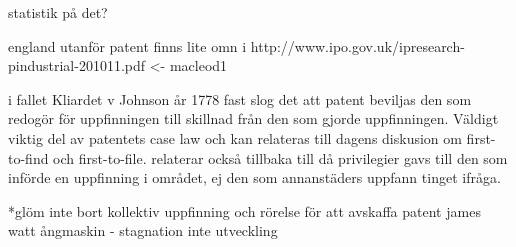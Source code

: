 statistik på det?

england utanför patent finns lite omn i http://www.ipo.gov.uk/ipresearch-pindustrial-201011.pdf <- macleod1


i fallet Kliardet v Johnson år 1778 fast slog det att patent beviljas den som redogör för uppfinningen
till skillnad från den som gjorde uppfinningen. Väldigt viktig del av patentets case law och kan
relateras till dagens diskusion om first-to-find och first-to-file. relaterar också tillbaka till då
privilegier gavs till den som införde en uppfinning i området, ej den som annanstäders uppfann tinget
ifråga.

*glöm inte bort kollektiv uppfinning och rörelse för att avskaffa patent james watt ångmaskin -
stagnation inte utveckling

